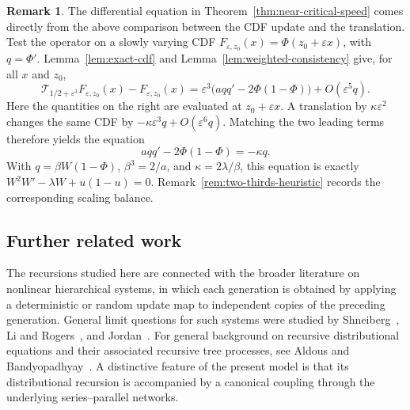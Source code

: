 \documentclass[12pt,preprint]{amsart}
\numberwithin{equation}{section}
\theoremstyle{plain}
\theoremstyle{definition}
\newtheorem{remark}[theorem]{Remark}
\begin{document}
\begin{remark}
    The differential equation in Theorem~\ref{thm:near-critical-speed} comes
directly from the above comparison between the CDF update and the translation. Test the operator on a slowly varying CDF
$F_{\varepsilon,z_0}(x)=\Phi(z_0+\varepsilon x)$, with
$q=\Phi'$.  Lemma~\ref{lem:exact-cdf} and
Lemma~\ref{lem:weighted-consistency} give, for all $x$ and $z_0$,
\[
 \mathcal T_{1/2+\varepsilon^3}F_{\varepsilon,z_0}(x)
 -F_{\varepsilon,z_0}(x)
 =\varepsilon^3\bigl(a q q'-2\Phi(1-\Phi)\bigr)
  +O(\varepsilon^5q).
\]
Here the quantities on the right are evaluated at
$z_0+\varepsilon x$.
A translation by $\kappa\varepsilon^2$ changes the same CDF by
$-\kappa\varepsilon^3q+O(\varepsilon^6q)$.  Matching the two leading terms
therefore yields the  equation
\[
 a q q'-2\Phi(1-\Phi)=-\kappa q.
\]
With $q=\beta W(1-\Phi)$, $\beta^3=2/a$, and
$\kappa=2\lambda/\beta$, this equation is exactly
$W^2W'-\lambda W+u(1-u)=0$.   Remark~\ref{rem:two-thirds-heuristic} records the corresponding
scaling balance.

\end{remark}



\subsection{Further related work}

The recursions studied here are connected with the broader literature on
nonlinear hierarchical systems, in which each generation is obtained by
applying a deterministic or random update map to independent copies of the
preceding generation.  General limit questions for such systems were studied
by Shneiberg~\cite{Shneiberg1986}, Li and Rogers~\cite{LiRogers1999}, and
Jordan~\cite{Jordan2002}.  For general background on recursive distributional
equations and their associated recursive tree processes, see Aldous and
Bandyopadhyay~\cite{AldousBandyopadhyay2005}.  A distinctive feature of the
present model is that its distributional recursion is accompanied by a
canonical coupling through the underlying series--parallel networks.
\end{document}
